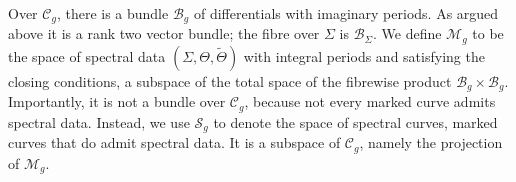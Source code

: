 Over $\mathcal{C}_g$, there is a bundle $\mathcal{B}_g$ of differentials with imaginary periods. As argued above it is a rank two vector bundle; the fibre over $Σ$ is $\mathcal{B}_Σ$. We define $\mathcal{M}_g$ to be the space of spectral data $(Σ,Θ,\tilde{Θ})$ with integral periods and satisfying the closing conditions, a subspace of the total space of the fibrewise product $\mathcal{B}_g \times \mathcal{B}_g$. Importantly, it is not a bundle over $\mathcal{C}_g$, because not every marked curve admits spectral data. Instead, we use $\mathcal{S}_g$ to denote the space of spectral curves, marked curves that do admit spectral data. It is a subspace of $\mathcal{C}_g$, namely the projection of $\mathcal{M}_g$.











\starttocentries

